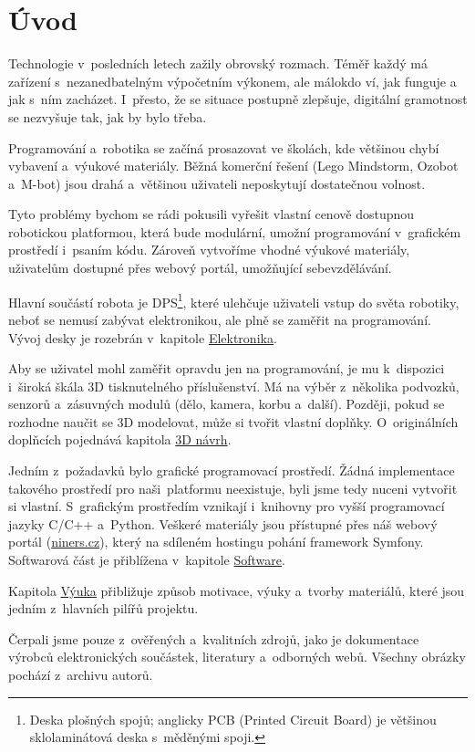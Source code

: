 \chapter*{Úvod}

Technologie v~posledních letech zažily obrovský rozmach. Téměř každý má zařízení s~nezanedbatelným výpočetním výkonem, ale málokdo ví, jak funguje a~ jak s~ním zacházet. I~přesto, že se situace postupně zlepšuje, digitální gramotnost se nezvyšuje tak, jak by bylo třeba.

Programování a~robotika se začíná prosazovat ve školách, kde většinou chybí vybavení a~výukové materiály. Běžná komerční řešení (Lego Mindstorm, Ozobot a~M-bot) jsou drahá a~většinou uživateli neposkytují dostatečnou volnost.

Tyto problémy bychom se rádi pokusili vyřešit vlastní cenově dostupnou robotickou platformou, která bude modulární, umožní programování v~grafickém prostředí i~psaním kódu. Zároveň vytvoříme vhodné výukové materiály, uživatelům dostupné přes webový portál, umožňující sebevzdělávání.

Hlavní součástí robota je DPS\footnote{Deska plošných spojů; anglicky PCB (Printed Circuit Board) je většinou sklolaminátová deska s~měděnými spoji.}, které ulehčuje uživateli vstup do světa robotiky, neboť se nemusí zabývat elektronikou, ale plně se zaměřit na programování. Vývoj desky je rozebrán v~kapitole \hyperlink{Elektronika}{Elektronika}.

Aby se uživatel mohl zaměřit opravdu jen na programování, je mu k~dispozici i~široká škála 3D tisknutelného příslušenství. Má na výběr z~několika podvozků, senzorů a~zásuvných modulů (dělo, kamera, korbu a~další). Později, pokud se rozhodne naučit se 3D modelovat, může si tvořit vlastní doplňky. O~originálních doplňcích pojednává kapitola \hyperlink{navrh}{3D návrh}.

Jedním z~požadavků bylo grafické programovací prostředí. Žádná implementace takového prostředí pro naši~platformu neexistuje, byli jsme tedy nuceni vytvořit si vlastní. S~grafickým prostředím vznikají i~knihovny pro vyšší programovací jazyky C/C++ a~Python. Veškeré materiály jsou přístupné přes náš webový portál (\href{http://niners.cz}{niners.cz}), který na sdíleném hostingu pohání framework Symfony. Softwarová část je přiblížena v~kapitole \hyperlink{software}{Software}.

Kapitola \hyperlink{vyuka}{Výuka} přibližuje způsob motivace, výuky a~tvorby materiálů, které jsou jedním z~hlavních pilířů projektu.

Čerpali jsme pouze z~ověřených a~kvalitních zdrojů, jako je dokumentace výrobců elektronických součástek, literatury a~odborných webů. Všechny obrázky pochází z~archivu autorů.